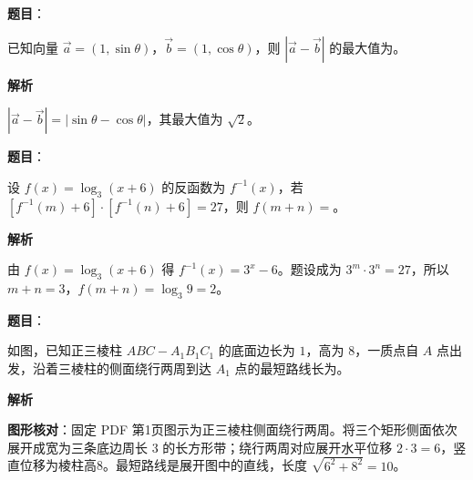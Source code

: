 \begin{answer}

\textbf{题目}：

已知向量 $\vec a=(1,\sin\theta)$，$\vec b=(1,\cos\theta)$，则 $|\vec a-\vec b|$ 的最大值为\gkblank{}。

\textbf{解析}

$|\vec a-\vec b|=|\sin\theta-\cos\theta|$，其最大值为 $\sqrt2$。


\end{answer}
\begin{answer}

\textbf{题目}：

设 $f(x)=\log_3(x+6)$ 的反函数为 $f^{-1}(x)$，若 $[f^{-1}(m)+6]\cdot[f^{-1}(n)+6]=27$，则 $f(m+n)=$\gkblank{}。

\textbf{解析}

由 $f(x)=\log_3(x+6)$ 得 $f^{-1}(x)=3^x-6$。题设成为 $3^m\cdot3^n=27$，所以 $m+n=3$，$f(m+n)=\log_3 9=2$。


\end{answer}
\begin{answer}

\textbf{题目}：

如图，已知正三棱柱 $ABC-A_1B_1C_1$ 的底面边长为 $1$，高为 $8$，一质点自 $A$ 点出发，沿着三棱柱的侧面绕行两周到达 $A_1$ 点的最短路线长为\gkblank{}。
\nopagebreak[4]
\begin{center}\end{center}
\nopagebreak[4]
\textbf{解析}

\textbf{图形核对}：固定 PDF 第1页图示为正三棱柱侧面绕行两周。将三个矩形侧面依次展开成宽为三条底边周长 $3$ 的长方形带；绕行两周对应展开水平位移 $2\cdot3=6$，竖直位移为棱柱高8。最短路线是展开图中的直线，长度 $\sqrt{6^2+8^2}=10$。


\end{answer}
